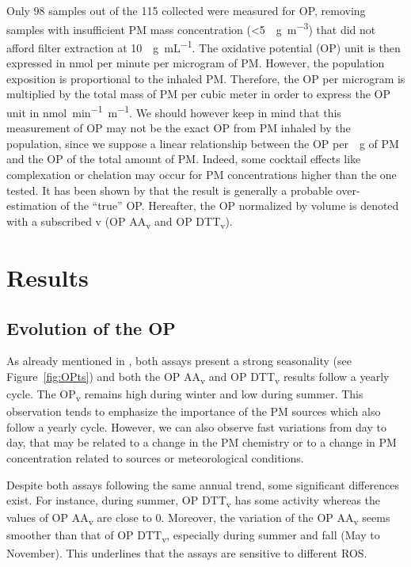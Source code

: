 \documentclass[acp, manuscript]{copernicus}
\begin{document}
Only 98 samples out of the 115 collected were measured for OP, removing samples
with insufficient PM mass concentration (\textless{}5~\unit{\mu g~m^{-3}}) that did
not afford filter extraction at 10~\unit{\mu g~mL^{-1}}. The oxidative potential
(OP) unit is then expressed in nmol per minute per microgram of PM. However, the
population exposition is proportional to the inhaled PM. Therefore, the OP per
microgram is multiplied by the total mass of PM per cubic meter in order to
express the OP unit in \unit{nmol~min^{-1}~m^{-1}}. We should however keep in mind
that this measurement of OP may not be the exact OP from PM inhaled by the
population, since we suppose a linear relationship between the OP per~\unit{\mu g}
of PM and the OP of the total amount of PM. Indeed, some cocktail effects
like complexation or chelation may occur for PM concentrations higher than the
one tested. It has been shown by \citet{calas_importance_2017} that the result
is generally a probable over-estimation of the ``true'' OP. Hereafter, the OP
normalized by volume is denoted with a subscribed v (OP AA\textsubscript{v} and
OP DTT\textsubscript{v}).

\section{Results}\label{results}

\subsection{Evolution of the OP}\label{evolution-of-the-op}

As already mentioned in \citet{calas_importance_2017}, both assays present a strong seasonality
(see Figure~\ref{fig:OPts}) and both the OP AA\textsubscript{v} and OP
DTT\textsubscript{v} results follow a yearly cycle. The
OP\textsubscript{v} remains high during winter and low during summer.
This observation tends to emphasize the importance of the PM sources
which also follow a yearly cycle. However, we can also observe fast
variations from day to day, that may be related to a change in the PM
chemistry or to a change in PM concentration related to sources or
meteorological conditions.

Despite both assays following the same annual trend, some significant
differences exist. For instance, during summer, OP DTT\textsubscript{v}
has some activity whereas the values of OP AA\textsubscript{v} are close
to 0. Moreover, the variation of the OP AA\textsubscript{v} seems
smoother than that of OP DTT\textsubscript{v}, especially during summer
and fall (May to November). This underlines that the assays are
sensitive to different ROS.
\end{document}
